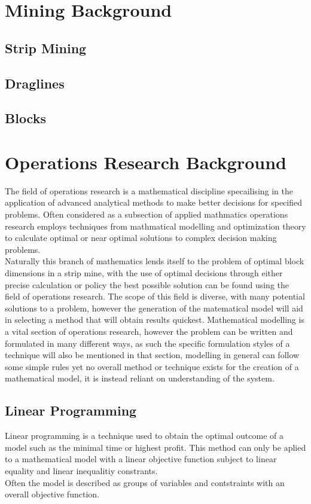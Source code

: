 \section{Mining Background}
\subsection{Strip Mining}
\subsection{Draglines}
\subsection{Blocks}

\section{Operations Research Background}
The field of operations research is a mathematical discipline specailising in the application of advanced analytical methods to make better decisions for specified problems. Often considered as a subsection of applied mathmatics operations research employs techniques from mathmatical modelling and optimization theory to calculate optimal or near optimal solutions to complex decision making problems. \\ Naturally this branch of mathematics lends itself to the problem of optimal block dimensions in a strip mine, with the use of optimal decisions through either precise calculation or policy the best possible solution can be found using the field of operations research. The scope of this field is diverse, with many potential solutions to a problem, however the generation of the matematical model will aid in selecting a method that will obtain results quickest. \newline
Mathematical modelling is a vital section of operations research, however the problem can be written and formulated in many different ways, as such the specific formulation styles of a technique will also be mentioned in that section, modelling in general can follow some simple rules yet no overall method or technique exists for the creation of a mathematical model, it is instead reliant on understanding of the system. 

\subsection{Linear Programming}
Linear programming is a technique used to obtain the optimal outcome of a model such as the minimal time or highest profit. This method can only be aplied to a mathematical model with a linear objective function subject to linear equality and linear inequalitiy constrants.\\ Often the model is described as groups of variables and contstraints with an overall objective function. 	

